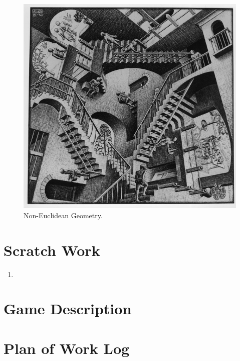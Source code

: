 \documentclass[11pt]{article}
\begin{document}
\begin{figure}
	\includegraphics[width=\linewidth]{concept_imgs/noneuclidean.png}
	\caption{Non-Euclidean Geometry. \cite{non-euclid-art}}
	\label{fig:non-euclidean}
\end{figure}

\section{Scratch Work}

\begin{enumerate}
	\item \(\)
\end{enumerate}

\section{Game Description}

\section{Plan of Work Log}

\printbibliography %
\end{document}
